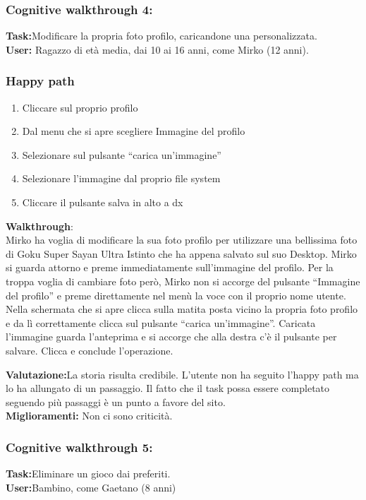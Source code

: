 \documentclass[../Report.tex]{subfiles}
\begin{document}
    \subsubsection{Cognitive walkthrough 4:}
    \textbf{Task:}Modificare la propria foto profilo, caricandone una personalizzata.
    \\
    \textbf{User:} Ragazzo di età media, dai 10 ai 16 anni, come Mirko (12 anni).
    \subsubsection{Happy path}
    \begin{enumerate}
        \item Cliccare sul proprio profilo
        \item Dal menu che si apre scegliere Immagine del profilo 
        \item Selezionare sul pulsante  “carica un’immagine”
        \item Selezionare l’immagine dal proprio file system
        \item Cliccare il pulsante salva in alto a dx
        
    \end{enumerate}
    \textbf{Walkthrough}:\\
    Mirko ha voglia di modificare la sua foto profilo per utilizzare una bellissima foto di Goku Super Sayan Ultra Istinto che ha appena salvato sul suo Desktop. Mirko si guarda attorno e preme immediatamente sull’immagine del profilo. Per la troppa voglia di cambiare foto però, Mirko non si accorge del pulsante “Immagine del profilo” e preme direttamente nel menù la voce con il proprio nome utente. Nella schermata che si apre clicca sulla matita posta vicino la propria foto profilo e da lì correttamente clicca sul pulsante  “carica un’immagine”. Caricata l’immagine guarda l’anteprima e si accorge che alla destra c’è il pulsante per salvare. Clicca e conclude l’operazione.

    \textbf{Valutazione:}La storia risulta credibile. L’utente non ha seguito l’happy path ma lo ha allungato di un passaggio. Il fatto che il task possa essere completato seguendo più passaggi è un punto a favore del sito.\\
    \textbf{Miglioramenti:} Non ci sono criticità.

    
    \subsubsection{Cognitive walkthrough 5:}
    \textbf{Task:}Eliminare un gioco dai preferiti.\\
    \textbf{User:}Bambino, come Gaetano (8 anni)
\end{document}
